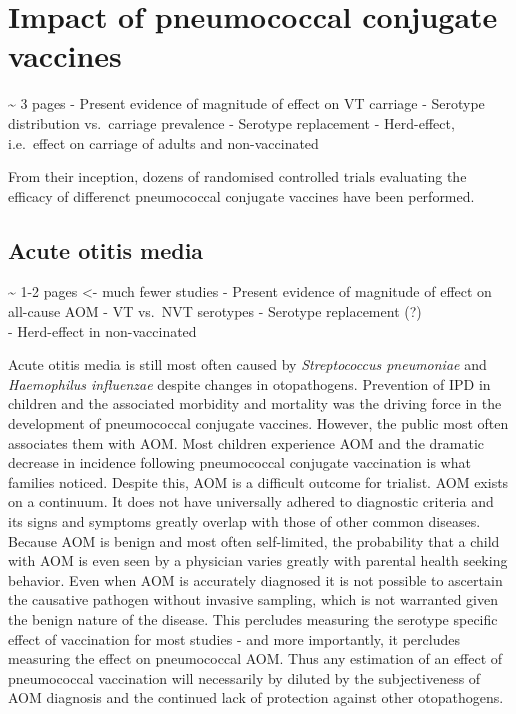 \documentclass[]{book}
\theoremstyle{definition}
\theoremstyle{definition}
\theoremstyle{definition}
\theoremstyle{remark}
\begin{document}
\section{Impact of pneumococcal conjugate
vaccines}\label{impact-of-pneumococcal-conjugate-vaccines}

\textasciitilde{} 3 pages - Present evidence of magnitude of effect on
VT carriage - Serotype distribution vs.~carriage prevalence - Serotype
replacement - Herd-effect, i.e.~effect on carriage of adults and
non-vaccinated

From their inception, dozens of randomised controlled trials evaluating
the efficacy of differenct pneumococcal conjugate vaccines have been
performed.

\subsection{Acute otitis media}\label{acute-otitis-media-1}

\textasciitilde{} 1-2 pages \textless{}- much fewer studies - Present
evidence of magnitude of effect on all-cause AOM - VT vs.~NVT serotypes
- Serotype replacement (?)\\
- Herd-effect in non-vaccinated

Acute otitis media is still most often caused by \emph{Streptococcus
pneumoniae} and \emph{Haemophilus influenzae} despite changes in
otopathogens. Prevention of IPD in children and the associated morbidity
and mortality was the driving force in the development of pneumococcal
conjugate vaccines. However, the public most often associates them with
AOM. Most children experience AOM and the dramatic decrease in incidence
following pneumococcal conjugate vaccination is what families noticed.
Despite this, AOM is a difficult outcome for trialist. AOM exists on a
continuum. It does not have universally adhered to diagnostic criteria
and its signs and symptoms greatly overlap with those of other common
diseases. Because AOM is benign and most often self-limited, the
probability that a child with AOM is even seen by a physician varies
greatly with parental health seeking behavior. Even when AOM is
accurately diagnosed it is not possible to ascertain the causative
pathogen without invasive sampling, which is not warranted given the
benign nature of the disease. This percludes measuring the serotype
specific effect of vaccination for most studies - and more importantly,
it percludes measuring the effect on pneumococcal AOM. Thus any
estimation of an effect of pneumococcal vaccination will necessarily by
diluted by the subjectiveness of AOM diagnosis and the continued lack of
protection against other otopathogens.
\end{document}
